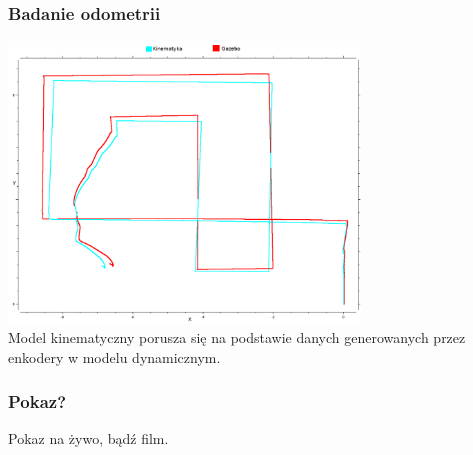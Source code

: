 \documentclass{beamer}
\begin{document}
	\begin{frame}
		\frametitle{Badanie odometrii}
		\centering
		\includegraphics[width=0.7\textwidth]{graphics/reen_1.png} \\
		Model kinematyczny porusza się na podstawie danych generowanych przez enkodery w modelu dynamicznym.
	\end{frame}
	\begin{frame}
		\frametitle{Pokaz?}
		Pokaz na żywo, bądź film.
	\end{frame}
 
\end{document}
